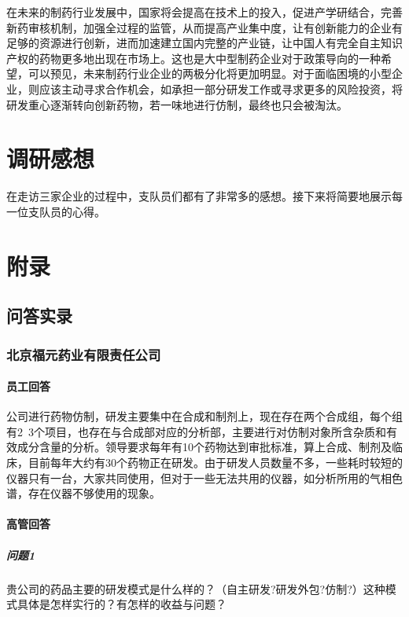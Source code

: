 \documentclass[twocolumn,openany]{ctexbook}
\begin{document}
	在未来的制药行业发展中，国家将会提高在技术上的投入，促进产学研结合，完善新药审核机制，加强全过程的监管，从而提高产业集中度，让有创新能力的企业有足够的资源进行创新，进而加速建立国内完整的产业链，让中国人有完全自主知识产权的药物更多地出现在市场上。这也是大中型制药企业对于政策导向的一种希望，可以预见，未来制药行业企业的两极分化将更加明显。对于面临困境的小型企业，则应该主动寻求合作机会，如承担一部分研发工作或寻求更多的风险投资，将研发重心逐渐转向创新药物，若一味地进行仿制，最终也只会被淘汰。
	
\onecolumn
\backmatter
	
	
\chapter{调研感想}
	在走访三家企业的过程中，支队员们都有了非常多的感想。接下来将简要地展示每一位支队员的心得。
	
	

\chapter{附录}

	\section*{问答实录}
	\subsection*{北京福元药业有限责任公司}
	\subsubsection*{员工回答}公司进行药物仿制，研发主要集中在合成和制剂上，现在存在两个合成组，每个组有2~3个项目，也存在与合成部对应的分析部，主要进行对仿制对象所含杂质和有效成分含量的分析。领导要求每年有10个药物达到审批标准，算上合成、制剂及临床，目前每年大约有30个药物正在研发。由于研发人员数量不多，一些耗时较短的仪器只有一台，大家共同使用，但对于一些无法共用的仪器，如分析所用的气相色谱，存在仪器不够使用的现象。
	
	\subsubsection*{高管回答}
	
	\paragraph{问题1}贵公司的药品主要的研发模式是什么样的？（自主研发?研发外包?仿制?）这种模式具体是怎样实行的？有怎样的收益与问题？
	
\end{document}
